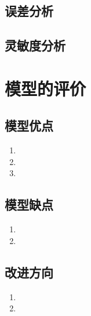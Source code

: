 \documentclass[withoutpreface,bwprint]{cumcmthesis} %
\begin{document}
\subsection{误差分析}
\subsection{灵敏度分析}


\section{模型的评价}
\subsection{模型优点}
\begin{enumerate}
    \item 
    \item 
    \item 
\end{enumerate}

\subsection{模型缺点}
\begin{enumerate}
    \item 
    \item 
\end{enumerate}

\subsection{改进方向}
\begin{enumerate}
    \item 
    \item 
\end{enumerate}


\end{document}

